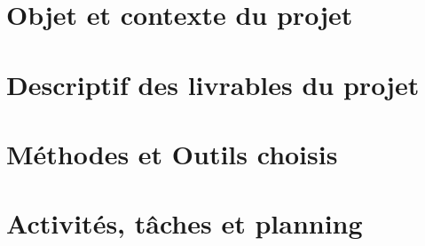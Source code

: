 

\newcommand{\mainTitle}{\'Etude préalable - SPIE}
\newcommand{\secondTitle}{Dossier d'Initialisation}




\listoftodos
\newpage
{}
\tableofcontents
{}
\listoffigures
{}
\listoftables
\newpage


\part{Objet et contexte du projet}
\setcounter{section}{0}

\part{Descriptif des livrables du projet}
\setcounter{section}{0}

\part{Méthodes et Outils choisis}
\setcounter{section}{0}

\part{Activités, tâches et planning}
\setcounter{section}{0}

